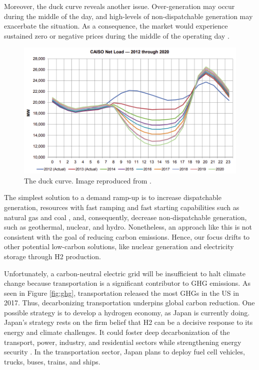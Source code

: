 Moreover, the duck curve reveals another issue.
Over-generation may occur during the middle of the day, and high-levels of non-dispatchable generation may exacerbate the situation.
As a consequence, the market would experience sustained zero or negative prices during the middle of the operating day \cite{bouillon_prepared_2014}.

\begin{figure}[htbp!]
	\centering
	\includegraphics[width=0.75\linewidth]{figures-hydro/caiso-duck.png}
	\hfill
	\caption{The duck curve. Image reproduced from \cite{bouillon_prepared_2014}.}
	\label{fig:duck}
\end{figure}

The simplest solution to a demand ramp-up is to increase dispatchable generation, resources with fast ramping and fast starting capabilities such as natural gas and coal \cite{bouillon_prepared_2014}, and, consequently, decrease non-dispatchable generation, such as geothermal, nuclear, and hydro.
Nonetheless, an approach like this is not consistent with the goal of reducing carbon emissions.
Hence, our focus drifts to other potential low-carbon solutions, like nuclear generation and electricity storage through \gls{H2} production.

Unfortunately, a carbon-neutral electric grid will be insufficient to halt climate change because transportation is a significant contributor to \gls{GHG} emissions.
As seen in Figure \ref{fig:ghg}, transportation released the most \glspl{GHG} in the \gls{US} in 2017. Thus, decarbonizing transportation underpins global carbon reduction.
One possible strategy is to develop a hydrogen economy, as Japan is currently doing.
Japan's strategy rests on the firm belief that \gls{H2} can be a decisive response to its energy and climate challenges.
It could foster deep decarbonization of the transport, power, industry, and residential sectors while strengthening energy security \cite{nagashima_japans_2018}.
In the transportation sector, Japan plans to deploy fuel cell vehicles, trucks, buses, trains, and ships.


